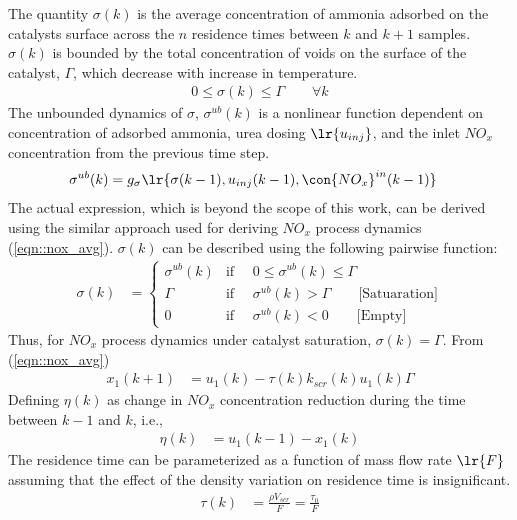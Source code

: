 The quantity $\sigma(k)$ is the average concentration of ammonia adsorbed on the catalysts surface across the $n$ residence times between $k$ and $k+1$ samples. $\sigma(k)$ is bounded by the total concentration of voids on the surface of the catalyst, $\Gamma$, which decrease with increase in temperature.
\begin{align}
    0 \leq \sigma(k) \leq \Gamma \qquad \forall k
\end{align}
The unbounded dynamics of $\sigma$, $\sigma^{ub}(k)$ is a nonlinear function dependent on concentration of adsorbed ammonia, urea dosing $\lr{u_{inj}}$, and the inlet $NO_x$ concentration from the previous time step.
\begin{align}
    \sigma^{ub}(k) &= g_{\sigma} \lr{ \sigma(k-1), u_{inj}(k-1), \con{NO_x}^{in}(k-1) }
\end{align}
The actual expression, which is beyond the scope of this work, can be derived using the similar approach used for
deriving $NO_x$ process dynamics (\ref{eqn::nox_avg}). $\sigma(k)$ can be described using the following pairwise
function:
\begin{align}
    \sigma(k) &=
    \begin{cases}
        \sigma^{ub}(k) & \text{if } \quad 0 \leq \sigma^{ub}(k) \leq \Gamma \\
        \Gamma         & \text{if } \quad \sigma^{ub}(k) > \Gamma \qquad \text{[Satuaration]}\\
        0              & \text{if } \quad \sigma^{ub}(k) < 0 \qquad \text{[Empty]}
    \end{cases}
\end{align}
Thus, for $NO_x$ process dynamics under catalyst saturation, $\sigma(k) = \Gamma$. From (\ref{eqn::nox_avg})
\begin{align}
    x_1(k+1) &= u_1(k) - \tau(k) k_{scr}(k) u_1(k) \Gamma
        \label{eqn::nox_mdl}
\end{align}
Defining $\eta(k)$ as change in $NO_x$ concentration reduction during the time between $k-1$ and $k$, i.e.,
\begin{align}
    \eta(k) &= u_1(k-1) - x_1 (k)
    \label{eqn::eta}
\end{align}
The residence time can be parameterized as a function of mass flow rate $\lr{F}$ assuming that the effect of the density variation on residence time is insignificant.
\begin{align}
    \tau(k) &= \frac{\rho V_{scr}}{F} = \frac{\tau_0}{F}
    \label{eqn::res_time}
\end{align}
